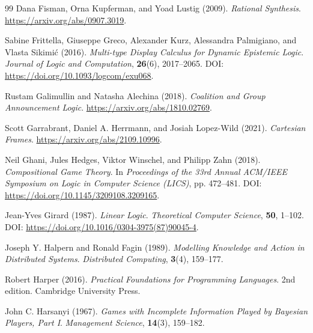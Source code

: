 \documentclass[11pt,a4paper]{article}
\numberwithin{equation}{section}
\theoremstyle{definition}
\theoremstyle{remark}
\theoremstyle{plain}
\begin{document}
\begin{thebibliography}{99}
Dana Fisman, Orna Kupferman, and Yoad Lustig (2009).
\newblock \emph{Rational Synthesis}.
\newblock \url{https://arxiv.org/abs/0907.3019}.

Sabine Frittella, Giuseppe Greco, Alexander Kurz, Alessandra Palmigiano, and Vlasta Sikimić (2016).
\newblock \emph{Multi-type Display Calculus for Dynamic Epistemic Logic}.
\newblock \emph{Journal of Logic and Computation}, \textbf{26}(6), 2017--2065.
\newblock DOI: \url{https://doi.org/10.1093/logcom/exu068}.

Rustam Galimullin and Natasha Alechina (2018).
\newblock \emph{Coalition and Group Announcement Logic}.
\newblock \url{https://arxiv.org/abs/1810.02769}.

Scott Garrabrant, Daniel A. Herrmann, and Josiah Lopez-Wild (2021).
\newblock \emph{Cartesian Frames}.
\newblock \url{https://arxiv.org/abs/2109.10996}.

Neil Ghani, Jules Hedges, Viktor Winschel, and Philipp Zahn (2018).
\newblock \emph{Compositional Game Theory}.
\newblock In \emph{Proceedings of the 33rd Annual ACM/IEEE Symposium on Logic in Computer Science (LICS)}, pp. 472--481.
\newblock DOI: \url{https://doi.org/10.1145/3209108.3209165}.

Jean-Yves Girard (1987).
\newblock \emph{Linear Logic}.
\newblock \emph{Theoretical Computer Science}, \textbf{50}, 1--102.
\newblock DOI: \url{https://doi.org/10.1016/0304-3975(87)90045-4}.

Joseph Y. Halpern and Ronald Fagin (1989).
\newblock \emph{Modelling Knowledge and Action in Distributed Systems}.
\newblock \emph{Distributed Computing}, \textbf{3}(4), 159--177.

Robert Harper (2016).
\newblock \emph{Practical Foundations for Programming Languages}.
\newblock 2nd edition. Cambridge University Press.

John C. Harsanyi (1967).
\newblock \emph{Games with Incomplete Information Played by Bayesian Players, Part I}.
\newblock \emph{Management Science}, \textbf{14}(3), 159--182.


\end{thebibliography}
\end{document}
